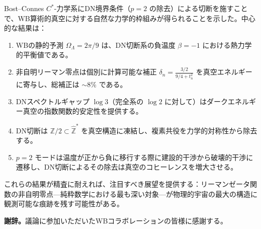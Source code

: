 \documentclass[12pt,a4paper]{article}
\newcommand{\OL}{\Omega_\Lambda}
\newcommand{\Zhat}{\hat{\mathbb{Z}}}
\begin{document}
Bost--Connes $C^*$-力学系にDN境界条件（$p=2$ の除去）による切断を施すことで、WB算術的真空に対する自然な力学的枠組みが得られることを示した。中心的な結果は：

\begin{enumerate}
\item WBの静的予測 $\OL = 2\pi/9$ は、DN切断系の負温度 $\beta = -1$ における熱力学的平衡値である。

\item 非自明リーマン零点は個別に計算可能な補正 $\delta_n = \frac{3/2}{9/4+t_n^2}$ を真空エネルギーに寄与し、総補正は $\sim 8\%$ である。

\item DNスペクトルギャップ $\log 3$（完全系の $\log 2$ に対して）はダークエネルギー真空の指数関数的安定性を提供する。

\item DN切断は $\mathbb{Z}/2 \subset \Zhat^*$ を真空構造に凍結し、複素共役を力学的対称性から除去する。

\item $p=2$ モードは温度が正から負に移行する際に建設的干渉から破壊的干渉に遷移し、DN切断によるその除去は真空のコヒーレンスを増大させる。
\end{enumerate}

これらの結果が精査に耐えれば、注目すべき展望を提供する：リーマンゼータ関数の非自明零点---純粋数学における最も深い対象---が物理的宇宙の最大の構造に観測可能な痕跡を残す可能性がある。

\bigskip

\noindent\textbf{謝辞。}議論に参加いただいたWBコラボレーションの皆様に感謝する。
\end{document}
